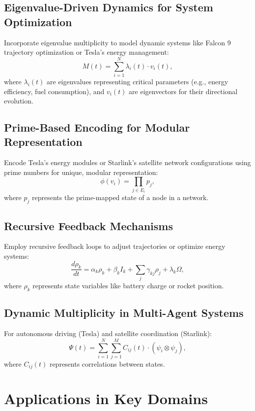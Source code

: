 \documentclass{article}
\theoremstyle{plain}
\begin{document}
\subsection{Eigenvalue-Driven Dynamics for System Optimization}
Incorporate eigenvalue multiplicity to model dynamic systems like Falcon 9 trajectory optimization or Tesla's energy management:
\begin{equation}
M(t) = \sum_{i=1}^N \lambda_i(t) \cdot v_i(t),
\end{equation}
where $\lambda_i(t)$ are eigenvalues representing critical parameters (e.g., energy efficiency, fuel consumption), and $v_i(t)$ are eigenvectors for their directional evolution.

\subsection{Prime-Based Encoding for Modular Representation}
Encode Tesla's energy modules or Starlink’s satellite network configurations using prime numbers for unique, modular representation:
\begin{equation}
\phi(v_i) = \prod_{j \in E_i} p_j,
\end{equation}
where $p_j$ represents the prime-mapped state of a node in a network.

\subsection{Recursive Feedback Mechanisms}
Employ recursive feedback loops to adjust trajectories or optimize energy systems:
\begin{equation}
\frac{d\rho_k}{dt} = \alpha_k \rho_k + \beta_k I_k + \sum_j \gamma_{kj} \rho_j + \lambda_k \Omega,
\end{equation}
where $\rho_k$ represents state variables like battery charge or rocket position.

\subsection{Dynamic Multiplicity in Multi-Agent Systems}
For autonomous driving (Tesla) and satellite coordination (Starlink):
\begin{equation}
\Psi(t) = \sum_{i=1}^N \sum_{j=1}^M C_{ij}(t) \cdot (\psi_i \otimes \psi_j),
\end{equation}
where $C_{ij}(t)$ represents correlations between states.

\section{Applications in Key Domains}
\end{document}
